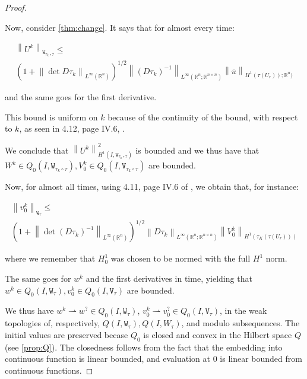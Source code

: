 \documentclass[english,a4paper,9pt,oneside]{scrbook}	%
\theoremstyle{break}
\newenvironment{mproof}[1][\proofname]{%
  \begin{proof}[#1]$ $\par\nobreak\ignorespaces
}{%
  \end{proof}
}
\renewcommand*{\proofname}{Proof}
\theoremstyle{remark}
\newcommand{\mR}{\mathbb{R}}
\newcommand{\norm}[1]{\left\lVert#1\right\rVert}
\newcommand{\te}{\theta}
\newcommand{\weakc}{\rightharpoonup}
\newcommand{\tw}[1]{\texttt{#1}}
\begin{document}
\begin{mproof}
Now, consider \cref{thm:change}. It says that for almost every time:

\begin{align*}
\norm{U^k}_{\tw{W}_{\tau_k\circ \tau}}\leq\\ \left ( 1+\norm{\det D\tau_k}_{L^\infty(\mR^n)}\right)^{1/2} \norm{(D\tau_k)^{-1}}_{L^\infty(\mR^n;\mR^{n\times n})}\norm{\bar{u}}_{H^1(\tau(U_r));\mR^n)}
\end{align*}

and the same goes for the first derivative. 



This bound is uniform on $k$ because of the continuity of the bound, with respect to $k$, as seen in 4.12, page IV.6, \cite{murat}.

We conclude that $\norm{U^k}_{H^1(I,\tw{W}_{\tau_k\circ \tau})}^2$ is bounded and we thus have that $W^k \in Q_0(I, \tw{W}_{\tau_k\circ \tau}), V_0^k \in Q_0(I,\tw{V}_{\tau_k\circ \tau})$ are bounded.

Now, for almost all times, using 4.11, page IV.6 of \cite{murat}, we obtain that, for instance:

\begin{align*}
\norm{v_0^k}_{\tw{W}_{ \tau}}\leq \\\left ( 1+\norm{\det (D\tau_k)^{-1}}_{L^\infty(\mR^n)}\right)^{1/2} \norm{D\tau_k}_{L^\infty(\mR^n;\mR^{n\times n})}\norm{V_0^k}_{H^1(\tau_K(\tau(U_r)))}
\end{align*}

where we remember that $H^1_0$ was chosen to be normed with the full $H^1$ norm.

The same goes for $w^k$ and the first derivatives in time, yielding that $w^k \in Q_0(I, \tw{W}_{ \tau}), v_0^k \in Q_0(I,\tw{V}_{\tau})$ are bounded.

We thus have $w^k\weakc w^? \in Q_0(I, \tw{W}_{ \tau})$, $v_0^k \weakc v_0^? \in Q_0(I,\tw{V}_{\tau})$, in the weak topologies of, respectively, $Q(I, \tw{W}_{ \tau}), Q(I,W_{\tau})$, and modulo subsequences. The initial values are preserved becase $Q_0$ is closed and convex in the Hilbert space $Q$ (see \cref{prop:Q}). The closedness follows from the fact that the embedding into continuous function is linear bounded, and evaluation at $0$ is linear bounded from continuous functions.


\end{mproof}
\end{document}
